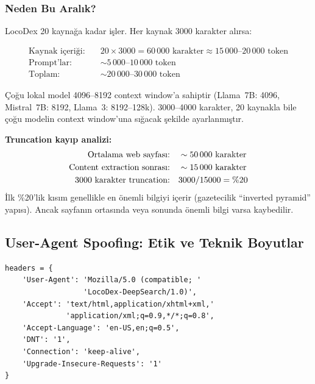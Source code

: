 \subsubsection{Neden Bu Aral{\i}k?}

LocoDex 20 kayna\u{g}a kadar i\c{s}ler. Her kaynak 3000 karakter al{\i}rsa:

\begin{align*}
\text{Kaynak i\c{c}eri\u{g}i:} \quad & 20 \times 3000 = 60\,000 \text{ karakter} \approx 15\,000\text{--}20\,000 \text{ token} \\
\text{Prompt'lar:}          \quad & \sim 5\,000\text{--}10\,000 \text{ token} \\
\text{Toplam:}              \quad & \sim 20\,000\text{--}30\,000 \text{ token}
\end{align*}

\noindent
\c{C}o\u{g}u lokal model 4096--8192 context window'a sahiptir (Llama~7B: 4096, Mistral~7B: 8192, Llama~3: 8192--128k). 3000--4000 karakter, 20 kaynakla bile \c{c}o\u{g}u modelin context window'una s{\i}\u{g}acak \c{s}ekilde ayarlanm{\i}\c{s}t{\i}r.

\begin{ornek}
\textbf{Truncation kay{\i}p analizi:}
\begin{align*}
\text{Ortalama web sayfas{\i}:}       & \quad \sim 50\,000 \text{ karakter} \\
\text{Content extraction sonras{\i}:} & \quad \sim 15\,000 \text{ karakter} \\
\text{3000 karakter truncation:}       & \quad 3000/15000 = \%20
\end{align*}
\.{I}lk \%20'lik k{\i}s{\i}m genellikle en \"{o}nemli bilgiyi i\c{c}erir (gazetecilik ``inverted pyramid'' yap{\i}s{\i}). Ancak sayfan{\i}n ortas{\i}nda veya sonunda \"{o}nemli bilgi varsa kaybedilir.
\end{ornek}


\subsection{User-Agent Spoofing: Etik ve Teknik Boyutlar}
\label{subsec:user-agent}

\begin{lstlisting}[caption={User-Agent header ayarlar{\i} (tavily\_search.py)}, label={lst:user-agent}]
headers = {
    'User-Agent': 'Mozilla/5.0 (compatible; '
                  'LocoDex-DeepSearch/1.0)',
    'Accept': 'text/html,application/xhtml+xml,'
              'application/xml;q=0.9,*/*;q=0.8',
    'Accept-Language': 'en-US,en;q=0.5',
    'DNT': '1',
    'Connection': 'keep-alive',
    'Upgrade-Insecure-Requests': '1'
}
\end{lstlisting}


